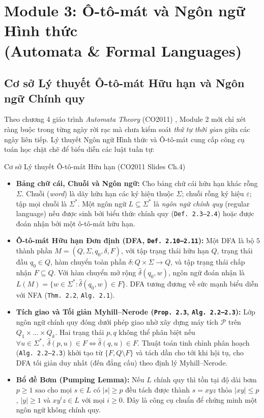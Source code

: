 \section[Module 3: Ô-tô-mát và Ngôn ngữ Hình thức (Automata \& Formal Languages)]{Module 3: Ô-tô-mát và Ngôn ngữ Hình thức\protect\\(Automata \& Formal Languages)}
\label{sec:m3}

\subsection{Cơ sở Lý thuyết Ô-tô-mát Hữu hạn và Ngôn ngữ Chính quy}
Theo chương 4 giáo trình \textit{Automata Theory} (CO2011) \cite{slides_automata,linz2017,hopcroft2006}, Module 2 mới chỉ xét ràng buộc trong từng ngày rời rạc mà chưa kiểm soát \textit{thứ tự thời gian} giữa các ngày liên tiếp. Lý thuyết Ngôn ngữ Hình thức và Ô-tô-mát cung cấp công cụ toán học chặt chẽ để biểu diễn các luật tuần tự:

\begin{theorybox}{Cơ sở Lý thuyết Ô-tô-mát Hữu hạn (CO2011 Slides Ch.4)}
\begin{itemize}
    \item \textbf{Bảng chữ cái, Chuỗi và Ngôn ngữ:} Cho bảng chữ cái hữu hạn khác rỗng $\Sigma$. Chuỗi (\textit{word}) là dãy hữu hạn các ký hiệu thuộc $\Sigma$; chuỗi rỗng ký hiệu $\varepsilon$; tập mọi chuỗi là $\Sigma^*$. Một ngôn ngữ $L \subseteq \Sigma^*$ là \textit{ngôn ngữ chính quy} (regular language) nếu được sinh bởi biểu thức chính quy (\texttt{Def. 2.3--2.4}) hoặc được đoán nhận bởi một ô-tô-mát hữu hạn.
    \item \textbf{Ô-tô-mát Hữu hạn Đơn định (DFA, \texttt{Def. 2.10--2.11}):} Một DFA là bộ $5$ thành phần $M = (Q, \Sigma, q_0, \delta, F)$, với tập trạng thái hữu hạn $Q$, trạng thái đầu $q_0 \in Q$, hàm chuyển toàn phần $\delta: Q \times \Sigma \to Q$, và tập trạng thái chấp nhận $F \subseteq Q$. Với hàm chuyển mở rộng $\hat{\delta}(q_0, w)$, ngôn ngữ đoán nhận là $L(M) = \{ w \in \Sigma^* : \hat{\delta}(q_0, w) \in F \}$. DFA tương đương về sức mạnh biểu diễn với NFA (\texttt{Thm. 2.2}, \texttt{Alg. 2.1}).
    \item \textbf{Tích giao và Tối giản Myhill--Nerode (\texttt{Prop. 2.3}, \texttt{Alg. 2.2--2.3}):} Lớp ngôn ngữ chính quy đóng dưới phép giao nhờ xây dựng máy tích $\mathcal{P}$ trên $Q_1 \times \dots \times Q_k$. Hai trạng thái $p, q$ không thể phân biệt nếu $\forall u \in \Sigma^*, \; \hat{\delta}(p, u) \in F \iff \hat{\delta}(q, u) \in F$. Thuật toán tinh chỉnh phân hoạch (\texttt{Alg. 2.2--2.3}) khởi tạo từ $\{F, Q \setminus F\}$ và tách dần cho tới khi hội tụ, cho DFA tối giản duy nhất (đến đẳng cấu) theo định lý Myhill--Nerode.
    \item \textbf{Bổ đề Bơm (Pumping Lemma):} Nếu $L$ chính quy thì tồn tại độ dài bơm $p \ge 1$ sao cho mọi $s \in L$ có $|s| \ge p$ đều tách được thành $s = xyz$ thỏa $|xy| \le p$, $|y| \ge 1$ và $xy^i z \in L$ với mọi $i \ge 0$. Đây là công cụ chuẩn để chứng minh một ngôn ngữ không chính quy.
\end{itemize}
\end{theorybox}

